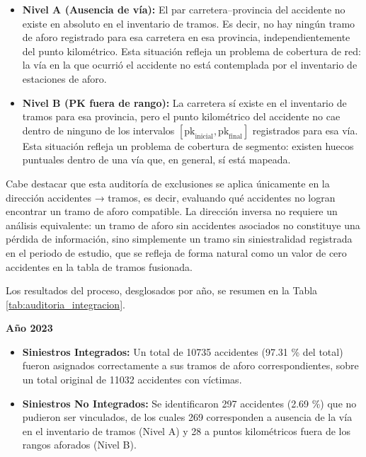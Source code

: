 \documentclass[twoside,a4paper,12pt,onecolumn,openany]{book}
\begin{document}
\begin{itemize}
    \item \textbf{Nivel A (Ausencia de vía):} El par carretera–provincia del accidente no existe en absoluto en el inventario de tramos. Es decir, no hay ningún tramo de aforo registrado para esa carretera en esa provincia, independientemente del punto kilométrico. Esta situación refleja un problema de cobertura de red: la vía en la que ocurrió el accidente no está contemplada por el inventario de estaciones de aforo.
    
    \item \textbf{Nivel B (PK fuera de rango):} La carretera sí existe en el inventario de tramos para esa provincia, pero el punto kilométrico del accidente no cae dentro de ninguno de los intervalos $[\text{pk}_{\text{inicial}}, \text{pk}_{\text{final}}]$ registrados para esa vía. Esta situación refleja un problema de cobertura de segmento: existen huecos puntuales dentro de una vía que, en general, sí está mapeada.
\end{itemize}

\vspace{0,5cm}

Cabe destacar que esta auditoría de exclusiones se aplica únicamente en la dirección accidentes → tramos, es decir, evaluando qué accidentes no logran encontrar un tramo de aforo compatible. La dirección inversa no requiere un análisis equivalente: un tramo de aforo sin accidentes asociados no constituye una pérdida de información, sino simplemente un tramo sin siniestralidad registrada en el periodo de estudio, que se refleja de forma natural como un valor de cero accidentes en la tabla de tramos fusionada.

\vspace{0,5cm}

Los resultados del proceso, desglosados por año, se resumen en la Tabla \ref{tab:auditoria_integracion}.

\vspace{0,5cm}

\textbf{Año 2023}

\begin{itemize}
    \item \textbf{Siniestros Integrados:} Un total de 10735 accidentes (97.31 \% del total) fueron asignados correctamente a sus tramos de aforo correspondientes, sobre un total original de 11032 accidentes con víctimas.
    
    \item \textbf{Siniestros No Integrados:} Se identificaron 297 accidentes (2.69 \%) que no pudieron ser vinculados, de los cuales 269 corresponden a ausencia de la vía en el inventario de tramos (Nivel A) y 28 a puntos kilométricos fuera de los rangos aforados (Nivel B).
\end{itemize}
\end{document}

